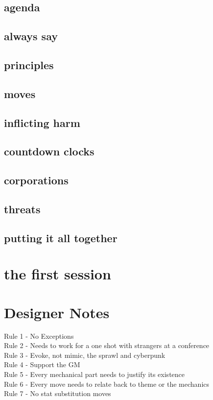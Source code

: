 \documentclass{tufte-book}
\begin{document}
\section{agenda}			\label{sec: agenda}
\section{always say}		\label{sec: always say}
\section{principles}			\label{sec: principles}
\section{moves}			\label{sec: mcmoves}
\section{inflicting harm}		\label{sec:inflicting harm}
\section{countdown clocks}	\label{sec:countdown clocks}
\section{corporations} 		\label{sec: corporations}
\section{threats}			\label{sec: threats}
\section{putting it all together} 	\label{sec: putting it all together}

\chapter{the first session} \label{ch: the first session}

\chapter{Designer Notes}

Rule 1 - No Exceptions\\
Rule 2 - Needs to work for a one shot with strangers at a conference\\
Rule 3 - Evoke, not mimic, the sprawl and cyberpunk\\
Rule 4 - Support the GM\\
Rule 5 - Every mechanical part needs to justify its existence\\
Rule 6 - Every move needs to relate back to theme or the mechanics\\
Rule 7 - No stat substitution moves\\
\end{document}
